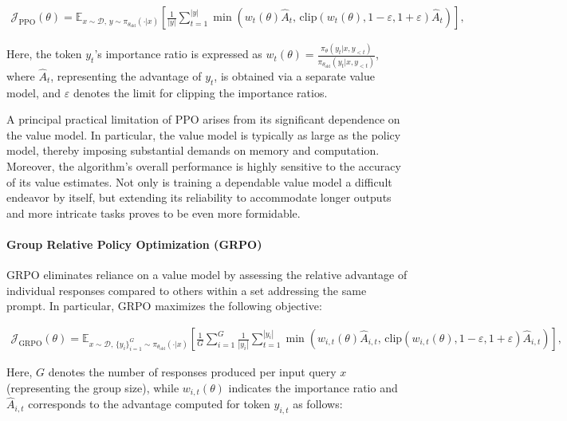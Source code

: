 \begin{align}
\mathcal{J}_\text{PPO}(\theta) = \mathbb{E}_{ x \sim \mathcal{D},\, y \sim \pi_{\theta_\text{old}}( \cdot | x) }
\left[ \frac{1}{|y|} \sum_{t=1}^{|y|} 
\min \left( w_{t}(\theta) \widehat{A}_{t},  \, \mathrm{clip} \left( w_{t}(\theta), 1 - {\varepsilon}, 1 + {\varepsilon}\right) \widehat{A}_{t} \right)
\right],
\end{align}

Here, the token $y_t$'s importance ratio is expressed as $w_{t}(\theta) = \frac{ \pi_{\theta} (y_{t} | x, y_{<t}) }{ \pi_{\theta_\text{old}} (y_{t} | x,y_{<t})}$, where $\widehat{A}_{t}$, representing the advantage of $y_t$, is obtained via a separate value model, and $\varepsilon$ denotes the limit for clipping the importance ratios.

A principal practical limitation of PPO arises from its significant dependence on the value model. In particular, the value model is typically as large as the policy model, thereby imposing substantial demands on memory and computation. Moreover, the algorithm’s overall performance is highly sensitive to the accuracy of its value estimates. Not only is training a dependable value model a difficult endeavor by itself, but extending its reliability to accommodate longer outputs and more intricate tasks proves to be even more formidable.

\paragraph{Group Relative Policy Optimization (GRPO)} GRPO \citep{grpo} eliminates reliance on a value model by assessing the relative advantage of individual responses compared to others within a set addressing the same prompt. In particular, GRPO maximizes the following objective:

\begin{align}
\label{equ:grpo}
\mathcal{J}_\text{GRPO}(\theta) = \mathbb{E}_{ x \sim \mathcal{D},\, \{y_i\}_{i=1}^G \sim \pi_{\theta_\text{old}}( \cdot | x) }
\left[ \frac{1}{G} \sum_{i=1}^{G} \frac{1}{|y_i|} \sum_{t=1}^{|y_i|} 
\min \left( w_{i,t}(\theta) \widehat{A}_{i,t},  \, \mathrm{clip} \left( w_{i,t}(\theta), 1 - {\varepsilon}, 1 + {\varepsilon}\right) \widehat{A}_{i,t} \right)
\right],
\end{align}

Here, $G$ denotes the number of responses produced per input query $x$ (representing the group size), while $w_{i,t}(\theta)$ indicates the importance ratio and $\widehat{A}_{i,t}$ corresponds to the advantage computed for token $y_{i,t}$ as follows:

